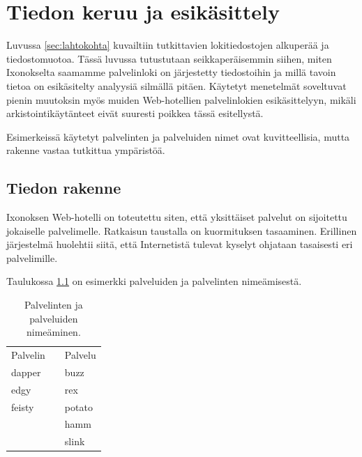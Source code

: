 
\chapter{Tiedon keruu ja esikäsittely}

Luvussa \ref{sec:lahtokohta} kuvailtiin tutkittavien lokitiedostojen
alkuperää ja tiedostomuotoa. Tässä luvussa tutustutaan
seikkaperäisemmin siihen, miten Ixonokselta saamamme palvelinloki on
järjestetty tiedostoihin ja millä tavoin tietoa on esikäsitelty
analyysiä silmällä pitäen. Käytetyt menetelmät soveltuvat pienin
muutoksin myös muiden Web-hotellien palvelinlokien esikäsittelyyn,
mikäli arkistointikäytänteet eivät suuresti poikkea tässä esitellystä.

Esimerkeissä käytetyt palvelinten ja palveluiden nimet ovat
kuvitteellisia, mutta rakenne vastaa tutkittua ympäristöä.


\section{Tiedon rakenne}

Ixonoksen Web-hotelli on toteutettu siten, että yksittäiset palvelut on
sijoitettu jokaiselle palvelimelle. Ratkaisun taustalla on
kuormituksen tasaaminen. Erillinen järjestelmä huolehtii siitä, että
Internetistä tulevat kyselyt ohjataan tasaisesti eri
palvelimille. 

Taulukossa \ref{nimet} on esimerkki palveluiden ja
palvelinten nimeämisestä.

\begin{table}[h]
\centering
\begin{tabular}{lll}
Palvelin && Palvelu \\
\cline{1-1}\cline{3-3}
dapper && buzz \\
edgy && rex \\
feisty && potato \\
&& hamm \\
&& slink \\
\end{tabular}
\caption{Palvelinten ja palveluiden nimeäminen.}
\label{nimet}
\end{table}

